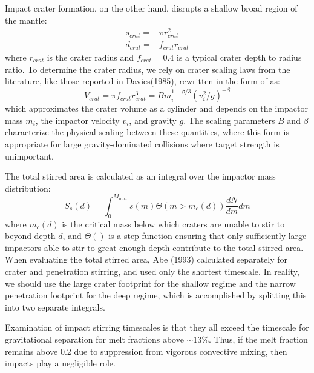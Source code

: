 Impact crater formation, on the other hand, disrupts a shallow broad region of the mantle:
\begin{eqnarray}
  s_{crat} =& \pi r_{crat}^2 \\
  d_{crat} =& f_{crat} r_{crat}
\end{eqnarray}
where $r_{crat}$ is the crater radius and $f_{crat}=0.4$ is a typical crater depth to radius ratio.
To determine the crater radius, we rely on crater scaling laws from the literature, like those reported in Davies(1985), rewritten in the form of \cite{ABE93} as:
\begin{equation}
  V_{crat} = \pi f_{crat} r_{crat}^3 = B m_i^{1-\beta/3} (v_i^2/g)^{+ \beta}
\end{equation}
which approximates the crater volume as a cylinder and depends on the impactor mass $m_i$, the impactor velocity $v_i$, and gravity $g$.
The scaling parameters $B$ and $\beta$ characterize the physical scaling between these quantities, where this form is appropriate for large gravity-dominated collisions where target strength is unimportant.

The total stirred area is calculated as an integral over the impactor mass distribution:
\begin{equation}
  S_s(d)= \int_0^{M_{max}} s(m)\Theta(m > m_c(d))  \frac{dN}{dm} dm
\end{equation}
where $m_c(d)$ is the critical mass below which craters are unable to stir to beyond depth $d$, and $\Theta()$ is a step function ensuring that only sufficiently large impactors able to stir to great enough depth contribute to the total stirred area.
When evaluating the total stirred area, Abe (1993) calculated separately for crater and penetration stirring, and used only the shortest timescale.
In reality, we should use the large crater footprint for the shallow regime and the narrow penetration footprint for the deep regime, which is accomplished by splitting this into two separate integrals.

Examination of impact stirring timescales is that they all exceed the timescale for gravitational separation for melt fractions above $\sim$13\%.
Thus, if the melt fraction remains above 0.2 due to suppression from vigorous convective mixing, then impacts play a negligible role.


